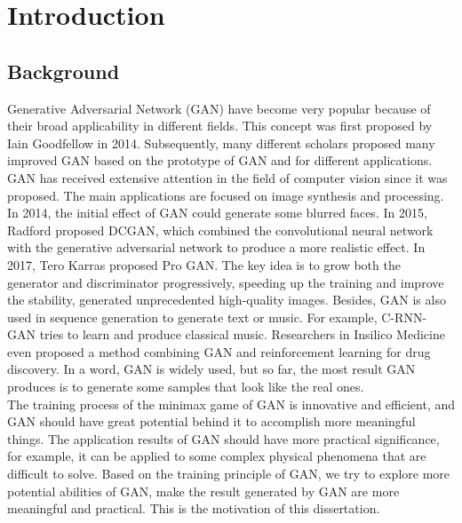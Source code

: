 \documentclass[11pt,a4paper]{article}
\begin{document}
\section{Introduction}
\subsection{Background}
Generative Adversarial Network (GAN)\citep{goodfellow2014generative} have become very popular because of their broad applicability in different fields. This concept was first proposed by Iain Goodfellow in 2014. Subsequently, many different scholars proposed many improved GAN based on the prototype of GAN and for different applications.
\\
\newline
GAN has received extensive attention in the field of computer vision since it was proposed. The main applications are focused on image synthesis and processing. In 2014, the initial effect of GAN could generate some blurred faces\citep{goodfellow2014generative}. In 2015, Radford proposed DCGAN, which combined the convolutional neural network with the generative adversarial network to produce a more realistic effect\citep{radford2015unsupervised}. In 2017, Tero Karras proposed Pro GAN. The key idea is to grow both the generator and discriminator progressively, speeding up the training and improve the stability, generated unprecedented high-quality images\citep{karras2017progressive}. Besides, GAN is also used in sequence generation to generate text or music. For example, C-RNN-GAN tries to learn and produce classical music\citep{mogren2016c}. Researchers in Insilico Medicine even proposed a method combining GAN and reinforcement learning for drug discovery\citep{putin2018adversarial}. In a word, GAN is widely used, but so far, the most result GAN produces is to generate some samples that look like the real ones. 
\\
\newline
The training process of the minimax game of GAN is innovative and efficient, and GAN should have great potential behind it to accomplish more meaningful things. The application results of GAN should have more practical significance, for example, it can be applied to some complex physical phenomena that are difficult to solve. Based on the training principle of GAN, we try to explore more potential abilities of GAN, make the result generated by GAN are more meaningful and practical. This is the motivation of this dissertation.
\\
\newline
\end{document}
